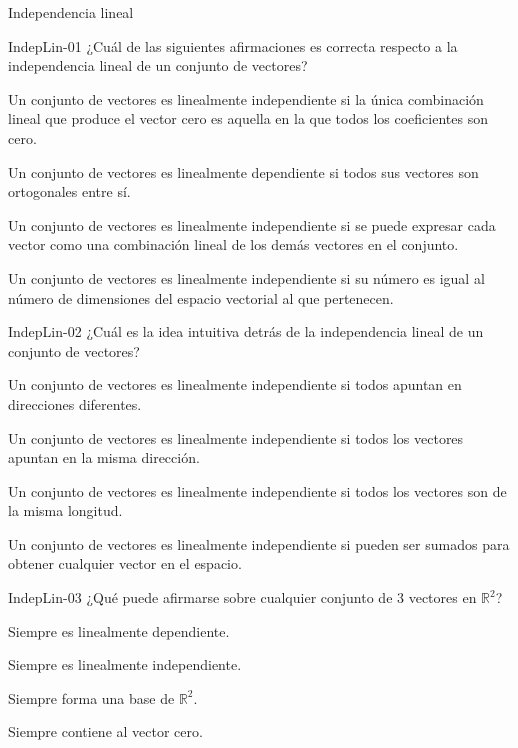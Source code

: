 \documentclass[a4,11pt]{aleph-notas}
\begin{document}
\begin{quiz}{Independencia lineal}

\begin{multi}[]%
    {IndepLin-01}
    ¿Cuál de las siguientes afirmaciones es correcta respecto a la independencia lineal de un conjunto de vectores?
    \item* Un conjunto de vectores es linealmente independiente si la única combinación lineal que produce el vector cero es aquella en la que todos los coeficientes son cero.
    \item Un conjunto de vectores es linealmente dependiente si todos sus vectores son ortogonales entre sí.
    \item Un conjunto de vectores es linealmente independiente si se puede expresar cada vector como una combinación lineal de los demás vectores en el conjunto.
    \item Un conjunto de vectores es linealmente independiente si su número es igual al número de dimensiones del espacio vectorial al que pertenecen.
\end{multi}

\begin{multi}[]%
    {IndepLin-02}
    ¿Cuál es la idea intuitiva detrás de la independencia lineal de un conjunto de vectores?
    \item* Un conjunto de vectores es linealmente independiente si todos apuntan en direcciones diferentes.
    \item Un conjunto de vectores es linealmente independiente si todos los vectores apuntan en la misma dirección.
    \item Un conjunto de vectores es linealmente independiente si todos los vectores son de la misma longitud.
    \item Un conjunto de vectores es linealmente independiente si pueden ser sumados para obtener cualquier vector en el espacio.
\end{multi}

\begin{multi}[]%
    {IndepLin-03}
    ¿Qué puede afirmarse sobre cualquier conjunto de 3 vectores en \(\mathbb{R}^2\)?
    \item* Siempre es linealmente dependiente.
    \item Siempre es linealmente independiente.
    \item Siempre forma una base de \(\mathbb{R}^2\).
    \item Siempre contiene al vector cero.
\end{multi}


\end{quiz}
\end{document}
